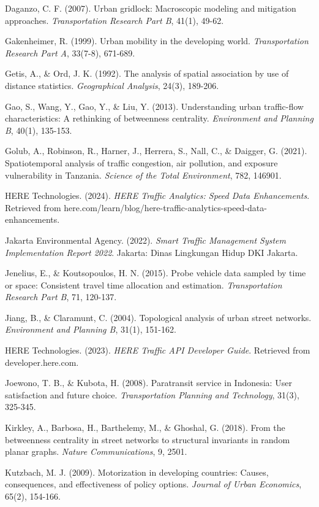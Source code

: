 \documentclass[12pt,a4paper]{article}
\begin{document}
Daganzo, C. F. (2007). Urban gridlock: Macroscopic modeling and mitigation approaches. \emph{Transportation Research Part B}, 41(1), 49-62.

Gakenheimer, R. (1999). Urban mobility in the developing world. \emph{Transportation Research Part A}, 33(7-8), 671-689.

Getis, A., \& Ord, J. K. (1992). The analysis of spatial association by use of distance statistics. \emph{Geographical Analysis}, 24(3), 189-206.

Gao, S., Wang, Y., Gao, Y., \& Liu, Y. (2013). Understanding urban traffic-flow characteristics: A rethinking of betweenness centrality. \emph{Environment and Planning B}, 40(1), 135-153.

Golub, A., Robinson, R., Harner, J., Herrera, S., Nall, C., \& Daigger, G. (2021). Spatiotemporal analysis of traffic congestion, air pollution, and exposure vulnerability in Tanzania. \emph{Science of the Total Environment}, 782, 146901.

HERE Technologies. (2024). \emph{HERE Traffic Analytics: Speed Data Enhancements}. Retrieved from here.com/learn/blog/here-traffic-analytics-speed-data-enhancements.

Jakarta Environmental Agency. (2022). \emph{Smart Traffic Management System Implementation Report 2022}. Jakarta: Dinas Lingkungan Hidup DKI Jakarta.

Jenelius, E., \& Koutsopoulos, H. N. (2015). Probe vehicle data sampled by time or space: Consistent travel time allocation and estimation. \emph{Transportation Research Part B}, 71, 120-137.

Jiang, B., \& Claramunt, C. (2004). Topological analysis of urban street networks. \emph{Environment and Planning B}, 31(1), 151-162.

HERE Technologies. (2023). \emph{HERE Traffic API Developer Guide}. Retrieved from developer.here.com.

Joewono, T. B., \& Kubota, H. (2008). Paratransit service in Indonesia: User satisfaction and future choice. \emph{Transportation Planning and Technology}, 31(3), 325-345.

Kirkley, A., Barbosa, H., Barthelemy, M., \& Ghoshal, G. (2018). From the betweenness centrality in street networks to structural invariants in random planar graphs. \emph{Nature Communications}, 9, 2501.

Kutzbach, M. J. (2009). Motorization in developing countries: Causes, consequences, and effectiveness of policy options. \emph{Journal of Urban Economics}, 65(2), 154-166.
\end{document}
